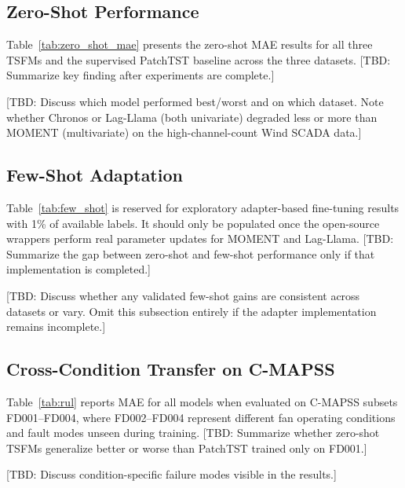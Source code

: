 
\subsection{Zero-Shot Performance}

Table~\ref{tab:zero_shot_mae} presents the zero-shot MAE results for all three TSFMs and the
supervised PatchTST baseline across the three datasets. [TBD: Summarize key finding after
experiments are complete.]



[TBD: Discuss which model performed best/worst and on which dataset. Note whether
Chronos or Lag-Llama (both univariate) degraded less or more than MOMENT (multivariate)
on the high-channel-count Wind SCADA data.]

\subsection{Few-Shot Adaptation}

Table~\ref{tab:few_shot} is reserved for exploratory adapter-based fine-tuning results with 1\% of available labels. It should only be populated once the open-source wrappers perform real parameter updates for MOMENT and Lag-Llama. [TBD: Summarize the gap between zero-shot and few-shot performance only if that implementation is completed.]



[TBD: Discuss whether any validated few-shot gains are consistent across datasets or vary. Omit this subsection entirely if the adapter implementation remains incomplete.]

\subsection{Cross-Condition Transfer on C-MAPSS}

Table~\ref{tab:rul} reports MAE for all models when evaluated on C-MAPSS subsets FD001--FD004,
where FD002--FD004 represent different fan operating conditions and fault modes unseen during
training. [TBD: Summarize whether zero-shot TSFMs generalize better or worse than
PatchTST trained only on FD001.]



[TBD: Discuss condition-specific failure modes visible in the results.]
